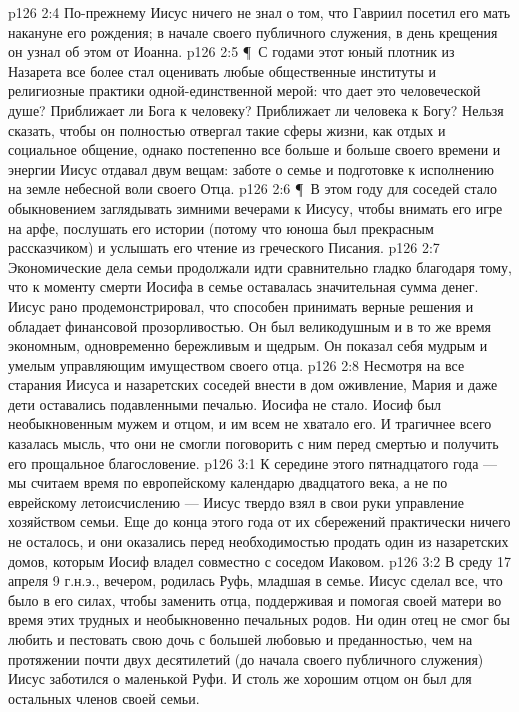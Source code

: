 \vs p126 2:4 По\hyp{}прежнему Иисус ничего не знал о том, что Гавриил посетил его мать накануне его рождения; в начале своего публичного служения, в день крещения он узнал об этом от Иоанна.
\vs p126 2:5 \P\ С годами этот юный плотник из Назарета все более стал оценивать любые общественные институты и религиозные практики одной\hyp{}единственной мерой: что дает это человеческой душе? Приближает ли Бога к человеку? Приближает ли человека к Богу? Нельзя сказать, чтобы он полностью отвергал такие сферы жизни, как отдых и социальное общение, однако постепенно все больше и больше своего времени и энергии Иисус отдавал двум вещам: заботе о семье и подготовке к исполнению на земле небесной воли своего Отца.
\vs p126 2:6 \P\ В этом году для соседей стало обыкновением заглядывать зимними вечерами к Иисусу, чтобы внимать его игре на арфе, послушать его истории (потому что юноша был прекрасным рассказчиком) и услышать его чтение из греческого Писания.
\vs p126 2:7 Экономические дела семьи продолжали идти сравнительно гладко благодаря тому, что к моменту смерти Иосифа в семье оставалась значительная сумма денег. Иисус рано продемонстрировал, что способен принимать верные решения и обладает финансовой прозорливостью. Он был великодушным и в то же время экономным, одновременно бережливым и щедрым. Он показал себя мудрым и умелым управляющим имуществом своего отца.
\vs p126 2:8 Несмотря на все старания Иисуса и назаретских соседей внести в дом оживление, Мария и даже дети оставались подавленными печалью. Иосифа не стало. Иосиф был необыкновенным мужем и отцом, и им всем не хватало его. И трагичнее всего казалась мысль, что они не смогли поговорить с ним перед смертью и получить его прощальное благословение.
\vs p126 3:1 К середине этого пятнадцатого года --- мы считаем время по европейскому календарю двадцатого века, а не по еврейскому летоисчислению --- Иисус твердо взял в свои руки управление хозяйством семьи. Еще до конца этого года от их сбережений практически ничего не осталось, и они оказались перед необходимостью продать один из назаретских домов, которым Иосиф владел совместно с соседом Иаковом.
\vs p126 3:2 В среду 17 апреля 9 г.н.э., вечером, родилась Руфь, младшая в семье. Иисус сделал все, что было в его силах, чтобы заменить отца, поддерживая и помогая своей матери во время этих трудных и необыкновенно печальных родов. Ни один отец не смог бы любить и пестовать свою дочь с большей любовью и преданностью, чем на протяжении почти двух десятилетий (до начала своего публичного служения) Иисус заботился о маленькой Руфи. И столь же хорошим отцом он был для остальных членов своей семьи.
